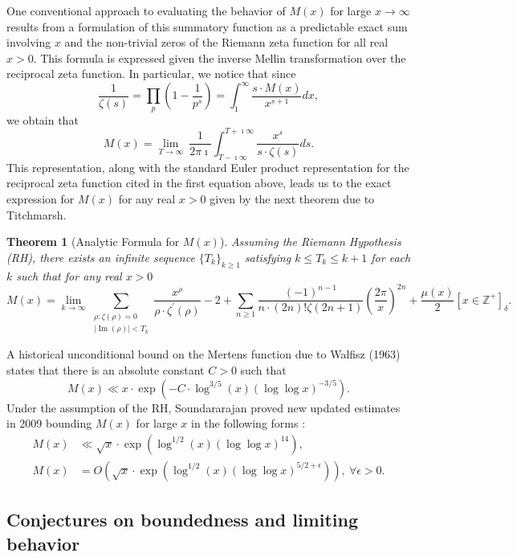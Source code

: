 \documentclass[11pt,reqno,a4letter]{article}
\numberwithin{figure}{section}
\numberwithin{table}{section}
\newcommand{\Iverson}[1]{\ensuremath{\left[#1\right]_{\delta}}}
\theoremstyle{plain}
\newtheorem{theorem}{Theorem}
\numberwithin{theorem}{section}
\theoremstyle{definition}
\renewcommand{\Im}{\operatorname{Im}}
\begin{document}
One conventional approach to evaluating the behavior of $M(x)$ for large 
$x \rightarrow \infty$ results from a formulation of this summatory 
function as a predictable exact sum involving $x$ and the non-trivial 
zeros of the Riemann zeta function for all real $x > 0$. 
This formula is expressed given the inverse Mellin transformation 
over the reciprocal zeta function. In particular, 
we notice that since 
\[
\frac{1}{\zeta(s)} = \prod_{p} \left(1 - \frac{1}{p^s}\right) = 
     \int_1^{\infty} \frac{s \cdot M(x)}{x^{s+1}} dx, 
\]
we obtain that 
\[
M(x) = \lim_{T \rightarrow \infty}\ \frac{1}{2\pi\imath} \int_{T-\imath\infty}^{T+\imath\infty} 
     \frac{x^s}{s \cdot \zeta(s)} ds. 
\] 
This representation, along with the standard Euler product 
representation for the reciprocal zeta function cited in the first equation above, leads us to the 
exact expression for $M(x)$ for any real $x > 0$ 
given by the next theorem due to Titchmarsh. 
\nocite{TITCHMARSH} 

\begin{theorem}[Analytic Formula for $M(x)$] 
\label{theorem_MxMellinTransformInvFormula} 
Assuming the Riemann Hypothesis (RH), there exists an infinite sequence 
$\{T_k\}_{k \geq 1}$ satisfying $k \leq T_k \leq k+1$ for each $k$ 
such that for any real $x > 0$ 
\[
M(x) = \lim_{k \rightarrow \infty} 
     \sum_{\substack{\rho: \zeta(\rho) = 0 \\ |\Im(\rho)| < T_k}} 
     \frac{x^{\rho}}{\rho \cdot \zeta^{\prime}(\rho)} - 2 + 
     \sum_{n \geq 1} \frac{(-1)^{n-1}}{n \cdot (2n)! \zeta(2n+1)} 
     \left(\frac{2\pi}{x}\right)^{2n} + 
     \frac{\mu(x)}{2} \Iverson{x \in \mathbb{Z}^{+}}. 
\] 
\end{theorem} 

A historical unconditional bound on the Mertens function due to Walfisz (1963) 
states that there is an absolute constant $C > 0$ such that 
$$M(x) \ll x \cdot \exp\left(-C \cdot \log^{3/5}(x) 
  (\log\log x)^{-3/5}\right).$$ 
Under the assumption of the RH, Soundararajan proved new updated estimates in 2009 
bounding $M(x)$ for large $x$ in the following forms \cite{SOUND-MERTENS-ANNALS}: 
\begin{align*} 
M(x) & \ll \sqrt{x} \cdot \exp\left(\log^{1/2}(x) (\log\log x)^{14}\right), \\ 
M(x) & = O\left(\sqrt{x} \cdot \exp\left( 
     \log^{1/2}(x) (\log\log x)^{5/2+\epsilon}\right)\right),\ 
     \forall \epsilon > 0. 
\end{align*} 

\subsection{Conjectures on boundedness and limiting behavior} 
\end{document}
